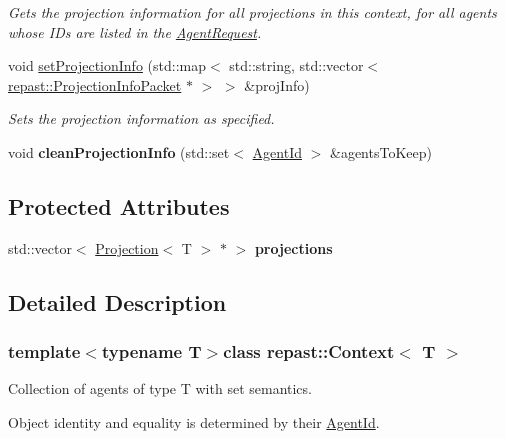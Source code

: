 \begin{DoxyCompactItemize}
\begin{DoxyCompactList}\small\item\em Gets the projection information for all projections in this context, for all agents whose I\-Ds are listed in the \hyperlink{classrepast_1_1_agent_request}{Agent\-Request}. \end{DoxyCompactList}\item 
void \hyperlink{classrepast_1_1_context_a9470dbe20a0b4243d52edea86c213feb}{set\-Projection\-Info} (std\-::map$<$ std\-::string, std\-::vector$<$ \hyperlink{classrepast_1_1_projection_info_packet}{repast\-::\-Projection\-Info\-Packet} $\ast$ $>$ $>$ \&proj\-Info)
\begin{DoxyCompactList}\small\item\em Sets the projection information as specified. \end{DoxyCompactList}\item 
\hypertarget{classrepast_1_1_context_a88097fca27376b1fc460bb75f47869bb}{void {\bfseries clean\-Projection\-Info} (std\-::set$<$ \hyperlink{classrepast_1_1_agent_id}{Agent\-Id} $>$ \&agents\-To\-Keep)}\label{classrepast_1_1_context_a88097fca27376b1fc460bb75f47869bb}

\end{DoxyCompactItemize}
\subsection*{Protected Attributes}
\begin{DoxyCompactItemize}
\item 
\hypertarget{classrepast_1_1_context_aed0c509cff2035ca99c2b2fc299dcca0}{std\-::vector$<$ \hyperlink{classrepast_1_1_projection}{Projection}$<$ T $>$ $\ast$ $>$ {\bfseries projections}}\label{classrepast_1_1_context_aed0c509cff2035ca99c2b2fc299dcca0}

\end{DoxyCompactItemize}


\subsection{Detailed Description}
\subsubsection*{template$<$typename T$>$class repast\-::\-Context$<$ T $>$}

Collection of agents of type T with set semantics. 

Object identity and equality is determined by their \hyperlink{classrepast_1_1_agent_id}{Agent\-Id}.


